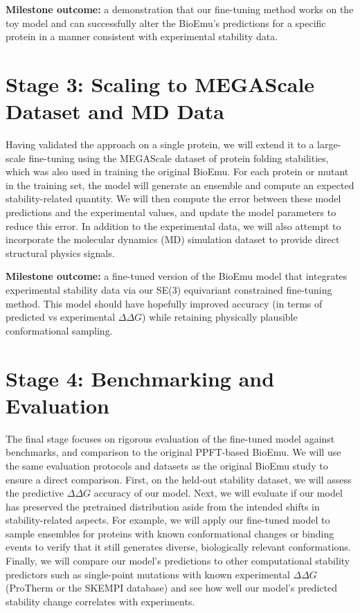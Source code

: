\documentclass{article}
\theoremstyle{plain}
\theoremstyle{definition}
\theoremstyle{remark}
\begin{document}
    {\bf Milestone outcome:} a demonstration that our fine-tuning method works on the toy model and can successfully alter the BioEmu's predictions for a specific protein in a manner consistent with experimental stability data.

\section{Stage 3: Scaling to MEGAScale Dataset and MD Data}

Having validated the approach on a single protein, we will extend it to a large-scale fine-tuning using the MEGAScale dataset of protein folding stabilities, which was also used in training the original BioEmu. For each protein or mutant in the training set, the model will generate an ensemble and compute an expected stability-related quantity. We will then compute the error between these model predictions and the experimental values, and update the model parameters to reduce this error. In addition to the experimental data, we will also attempt to incorporate the molecular dynamics (MD) simulation dataset to provide direct structural physics signals.

    {\bf Milestone outcome:} a fine-tuned version of the BioEmu model that integrates experimental stability data via our SE(3) equivariant constrained fine-tuning method. This model should have hopefully improved accuracy (in terms of predicted vs experimental $\Delta\Delta G$) while retaining physically plausible conformational sampling.

\section{Stage 4: Benchmarking and Evaluation}

The final stage focuses on rigorous evaluation of the fine-tuned model against benchmarks, and comparison to the original PPFT-based BioEmu. We will use the same evaluation protocols and datasets as the original BioEmu study to ensure a direct comparison.
First, on the held-out stability dataset, we will assess the predictive $\Delta\Delta G$ accuracy of our model.
Next, we will evaluate if our model has preserved the pretrained distribution aside from the intended shifts in stability-related aspects. For example, we will apply our fine-tuned model to sample ensembles for proteins with known conformational changes or binding events to verify that it still generates diverse, biologically relevant conformations.
Finally, we will compare our model’s predictions to other computational stability predictors such as single-point mutations with known experimental $\Delta\Delta G$ (ProTherm or the SKEMPI database) and see how well our model’s predicted stability change correlates with experiments.
\end{document}
